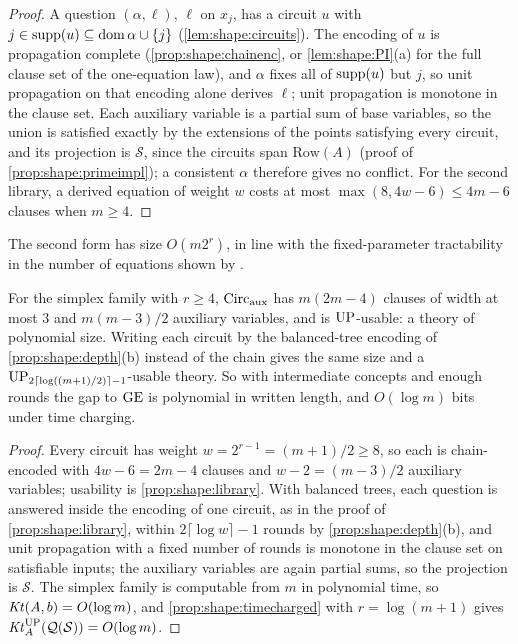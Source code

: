 \begin{proof}
A question $(\alpha,\ell)$, $\ell$ on $x_j$, has a circuit $u$ with $j\in\operatorname{supp}(u)\subseteq\operatorname{dom}\alpha\cup\{j\}$ (\cref{lem:shape:circuits}). The encoding of $u$ is propagation complete (\cref{prop:shape:chainenc}, or \cref{lem:shape:PI}(a) for the full clause set of the one-equation law), and $\alpha$ fixes all of $\operatorname{supp}(u)$ but $j$, so unit propagation on that encoding alone derives $\ell$; unit propagation is monotone in the clause set. Each auxiliary variable is a partial sum of base variables, so the union is satisfied exactly by the extensions of the points satisfying every circuit, and its projection is $\mathcal S$, since the circuits span $\mathrm{Row}(A)$ (proof of \cref{prop:shape:primeimpl}); a consistent $\alpha$ therefore gives no conflict. For the second library, a derived equation of weight $w$ costs at most $\max(8,4w-6)\le4m-6$ clauses when $m\ge4$.
\end{proof}

The second form has size $O(m2^r)$, in line with the fixed-parameter tractability in the number of equations shown by \citet{gwynne2014sat}.

\begin{remark}\label{rem:shape:simplexaux}
For the simplex family with $r\ge4$, $\mathrm{Circ}_{\rm aux}$ has $m(2m-4)$ clauses of width at most $3$ and $m(m-3)/2$ auxiliary variables, and is $\mathrm{UP}$-usable: a theory of polynomial size. Writing each circuit by the balanced-tree encoding of \cref{prop:shape:depth}(b) instead of the chain gives the same size and a $\mathrm{UP}_{2\lceil\log((m+1)/2)\rceil-1}$-usable theory. So with intermediate concepts and enough rounds the gap to $\mathrm{GE}$ is polynomial in written length, and $O(\log m)$ bits under time charging.
\end{remark}

\begin{proof}
Every circuit has weight $w=2^{r-1}=(m+1)/2\ge8$, so each is chain-encoded with $4w-6=2m-4$ clauses and $w-2=(m-3)/2$ auxiliary variables; usability is \cref{prop:shape:library}. With balanced trees, each question is answered inside the encoding of one circuit, as in the proof of \cref{prop:shape:library}, within $2\lceil\log w\rceil-1$ rounds by \cref{prop:shape:depth}(b), and unit propagation with a fixed number of rounds is monotone in the clause set on satisfiable inputs; the auxiliary variables are again partial sums, so the projection is $\mathcal S$. The simplex family is computable from $m$ in polynomial time, so $\mathit{Kt}(A,b)=O(\log m)$, and \cref{prop:shape:timecharged} with $r=\log(m+1)$ gives $\mathit{Kt}_{A}^{\mathrm{UP}}(\mathcal Q(\mathcal S))=O(\log m)$.
\end{proof}

